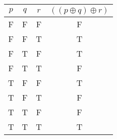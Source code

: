 \begin{tabular}{|c|c|c||c|}
\hline
$ p $ & $ q $ & $ r $ & $ ((p \oplus q) \oplus r) $ \\
\hline
F & F & F & F \\
F & F & T & T \\
F & T & F & T \\
F & T & T & F \\
T & F & F & T \\
T & F & T & F \\
T & T & F & F \\
T & T & T & T \\
\hline
\end{tabular}
\label{table:tt1}

